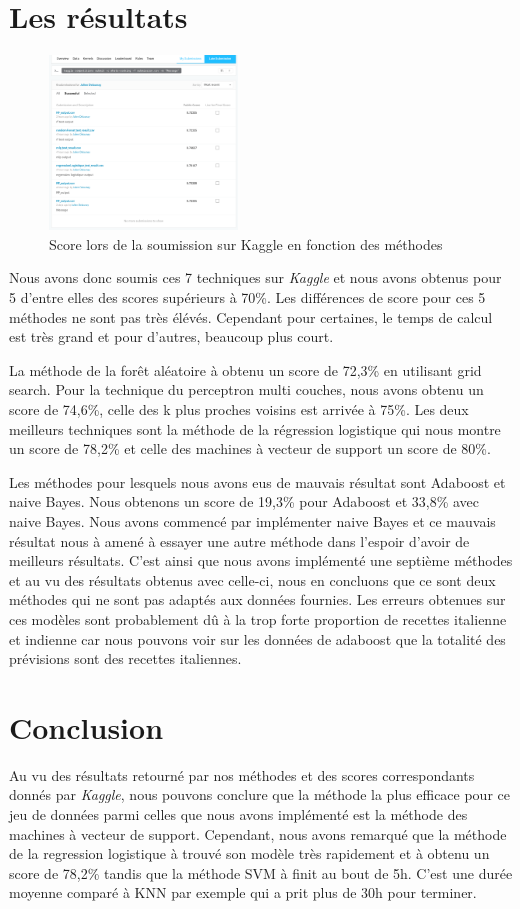 \documentclass[12pt]{article}
\begin{document}
\newpage
\section{Les résultats}

\begin{figure}
	\includegraphics[width=5cm]{./soumission_kaggle.png}
	\caption{Score lors de la soumission sur Kaggle en fonction des méthodes}
\end{figure}
Nous avons donc soumis ces 7 techniques sur \textit{Kaggle} et nous avons obtenus pour 5 d'entre elles des scores supérieurs à 70\%. Les différences de score pour ces 5 méthodes ne sont pas très élévés. Cependant pour certaines, le temps de calcul est très grand et pour d'autres, beaucoup plus court.

La méthode de la forêt aléatoire à obtenu un score de 72,3\% en utilisant grid search. Pour la technique du perceptron multi couches, nous avons obtenu un score de 74,6\%, celle des k plus proches voisins est arrivée à 75\%. Les deux meilleurs techniques sont la méthode de la régression logistique qui nous montre un score de 78,2\% et celle des machines à vecteur de support un score de 80\%.

Les méthodes pour lesquels nous avons eus de mauvais résultat sont Adaboost et naive Bayes. Nous obtenons un score de 19,3\% pour Adaboost et 33,8\% avec naive Bayes. Nous avons commencé par implémenter naive Bayes et ce mauvais résultat nous à amené à essayer une autre méthode dans l'espoir d'avoir de meilleurs résultats. C'est ainsi que nous avons implémenté une septième méthodes et au vu des résultats obtenus avec celle-ci, nous en concluons que ce sont deux méthodes qui ne sont pas adaptés aux données fournies. Les erreurs obtenues sur ces modèles sont probablement dû à la trop forte proportion de recettes italienne et indienne car nous pouvons voir sur les données de adaboost que la totalité des prévisions sont des recettes italiennes.


\section{Conclusion}
Au vu des résultats retourné par nos méthodes et des scores correspondants donnés par \textit{Kaggle}, nous pouvons conclure que la méthode la plus efficace pour ce jeu de données parmi celles que nous avons implémenté est la méthode des machines à vecteur de support. Cependant, nous avons remarqué que la méthode de la regression logistique à trouvé son modèle très rapidement et à obtenu un score de 78,2\% tandis que la méthode SVM à finit au bout de 5h. C'est une durée moyenne comparé à KNN par exemple qui a prit plus de 30h pour terminer.
\end{document}
